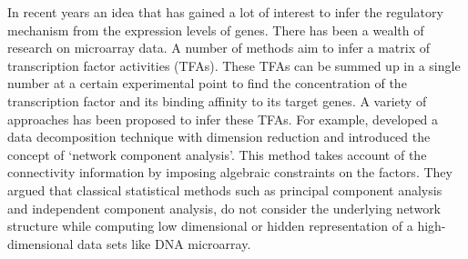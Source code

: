 
In recent years an idea that has gained a lot of interest to infer the regulatory mechanism from the expression levels of genes. There has been a wealth of research on microarray data. A number of methods \cite{Alter:2004, Gao:2004, Liao:2003} aim to infer a matrix of transcription factor activities (TFAs). These TFAs can be summed up in a single number at a certain experimental point to find the concentration of the transcription factor and its binding affinity to its target genes. A variety of approaches has been proposed to infer these TFAs. For example, \cite{Liao:2003} developed a data decomposition technique with dimension reduction and introduced the concept of ‘network component analysis’. This method takes account of the connectivity information by imposing algebraic constraints on the factors. They argued that classical statistical methods such as principal component analysis and independent component analysis, do not consider the underlying network structure while computing low dimensional or hidden representation of a high-dimensional data sets like DNA microarray. 

